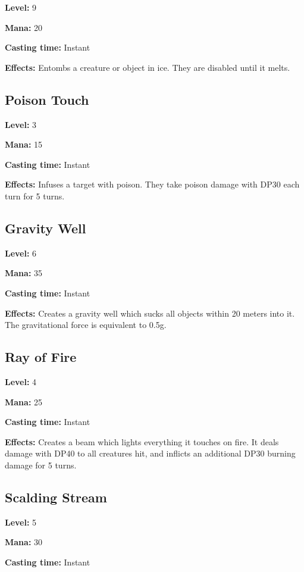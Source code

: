 \documentclass[]{article}
\begin{document}
\textbf{Level:} 9

\textbf{Mana:} 20

\textbf{Casting time:} Instant

\textbf{Effects:} Entombs a creature or object in ice. They are disabled
until it melts.

\subsection{Poison Touch}\label{poison-touch}

\textbf{Level:} 3

\textbf{Mana:} 15

\textbf{Casting time:} Instant

\textbf{Effects:} Infuses a target with poison. They take poison damage
with DP30 each turn for 5 turns.

\subsection{Gravity Well}\label{gravity-well}

\textbf{Level:} 6

\textbf{Mana:} 35

\textbf{Casting time:} Instant

\textbf{Effects:} Creates a gravity well which sucks all objects within
20 meters into it. The gravitational force is equivalent to 0.5g.

\subsection{Ray of Fire}\label{ray-of-fire}

\textbf{Level:} 4

\textbf{Mana:} 25

\textbf{Casting time:} Instant

\textbf{Effects:} Creates a beam which lights everything it touches on
fire. It deals damage with DP40 to all creatures hit, and inflicts an
additional DP30 burning damage for 5 turns.

\subsection{Scalding Stream}\label{scalding-stream}

\textbf{Level:} 5

\textbf{Mana:} 30

\textbf{Casting time:} Instant
\end{document}
